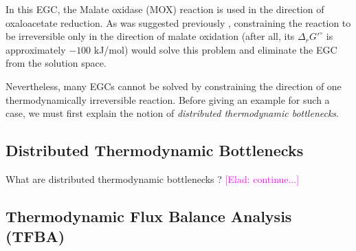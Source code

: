 \documentclass[twocolumn]{bmcart}%
\newcommand{\elad}[1]{{\textcolor{magenta}{[Elad: {#1}]}}}
\begin{document}
In this EGC, the Malate oxidase (MOX) reaction is used in the direction of oxaloacetate reduction. As was suggested previously \cite{Fritzemeier2017-ba}, constraining the reaction to be irreversible only in the direction of malate oxidation (after all, its $\Delta_r G'^\circ$ is approximately $-100$ kJ/mol) would solve this problem and eliminate the EGC from the solution space.

Nevertheless, many EGCs cannot be solved by constraining the direction of one thermodynamically irreversible reaction. Before giving an example for such a case, we must first explain the notion of \emph{distributed thermodynamic bottlenecks}.


\subsection*{Distributed Thermodynamic Bottlenecks}
What are distributed thermodynamic bottlenecks \cite{Mavrovouniotis1993-zq, Mavrovouniotis1996-dq}?
\elad{continue...}

\subsection*{Thermodynamic Flux Balance Analysis (TFBA)}
\end{document}
